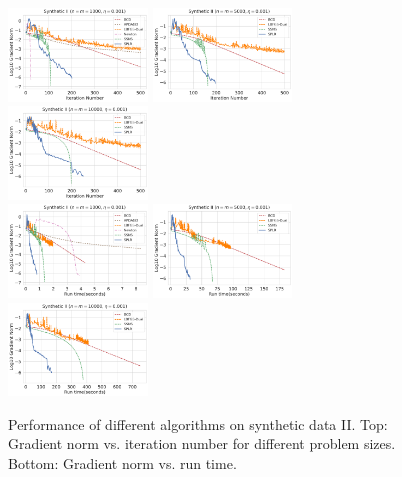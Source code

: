 \documentclass{article}
\theoremstyle{plain}
\theoremstyle{definition}
\theoremstyle{remark}
\begin{document}
\begin{figure}[p]
    \centering
    \includegraphics[width=0.33\textwidth]{save/Synthetic II/iterations/n=1000, m=1000, reg=0.001}
    \includegraphics[width=0.33\textwidth]{save/Synthetic II/iterations/n=5000, m=5000, reg=0.001}
    \includegraphics[width=0.33\textwidth]{save/Synthetic II/iterations/n=10000, m=10000, reg=0.001} \\
    \includegraphics[width=0.33\textwidth]{save/Synthetic II/run_times/n=1000, m=1000, reg=0.001}
    \includegraphics[width=0.33\textwidth]{save/Synthetic II/run_times/n=5000, m=5000, reg=0.001}
    \includegraphics[width=0.33\textwidth]{save/Synthetic II/run_times/n=10000, m=10000, reg=0.001}
    \caption{Performance of different algorithms on synthetic data II. Top: Gradient norm vs. iteration number for different problem sizes. Bottom: Gradient norm vs. run time.}
    \label{fig:synthetic_2}
\end{figure}
\end{document}
